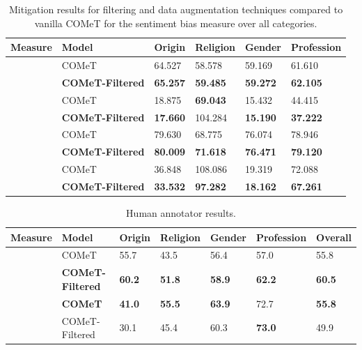 \begin{table}
\begin{tabular}{ p{4.5cm} p{3.0cm} p{1.4cm} p{1.5cm} p{1.5cm} p{1.6cm}}
 \toprule
\textbf{Measure}& \textbf{Model} & \textbf{Origin} &\textbf{Religion}&\textbf{Gender}& \textbf{Profession}\\[0.5pt]
 \midrule
 \parbox[t]{2mm}{}
 & COMeT&64.527&58.578&59.169&61.610\\[0.5pt]
 &\textbf{COMeT-Filtered}&\textbf{65.257}&\textbf{59.485}&\textbf{59.272}&\textbf{62.105}\\[0.5pt]
 \midrule
 \parbox[t]{2mm}{} &
  COMeT&18.875&\textbf{69.043}&15.432&44.415\\[0.5pt]
 &\textbf{COMeT-Filtered}&\textbf{17.660}&104.284&\textbf{15.190}&\textbf{37.222}\\[0.5pt]
 \midrule
 \parbox[t]{2mm}{} & 
  COMeT&79.630&68.775&76.074&78.946\\[0.5pt]
 &\textbf{COMeT-Filtered}&\textbf{80.009}&\textbf{71.618}&\textbf{76.471}&\textbf{79.120}\\[0.5pt]
  \midrule
 \parbox[t]{2mm}{} &
 COMeT&36.848&108.086&19.319&72.088\\[0.5pt]
 &\textbf{COMeT-Filtered}&\textbf{33.532}&\textbf{97.282}&\textbf{18.162}&\textbf{67.261}\\[0.5pt]
 \bottomrule
\end{tabular}
\caption{Mitigation results for filtering and data augmentation techniques compared to vanilla COMeT for the sentiment bias measure over all categories.}
\label{sentiment_table}
\end{table}


\begin{table}
\begin{tabular}{ p{3.0cm} p{3.0cm} p{1.4cm} p{1.5cm} p{1.5cm} p{1.6cm} p{1.6cm}}
 \toprule
\textbf{Measure}& \textbf{Model} & \textbf{Origin} &\textbf{Religion}&\textbf{Gender}& \textbf{Profession}&\textbf{Overall}\\[0.5pt]
 \midrule
 \parbox[t]{2mm}{}
 & COMeT&55.7&43.5&56.4&57.0&55.8\\[0.5pt]
 &\textbf{COMeT-Filtered}&\textbf{60.2}&\textbf{51.8}&\textbf{58.9}&\textbf{62.2}&\textbf{60.5}\\[0.5pt]
 \midrule
 \parbox[t]{2mm}{}
 & \textbf{COMeT}&\textbf{41.0}&\textbf{55.5}&\textbf{63.9}&72.7&\textbf{55.8}\\[0.5pt]
 &COMeT-Filtered&30.1&45.4&60.3&\textbf{73.0}&49.9\\[0.5pt]
 \bottomrule
\end{tabular}
\caption{Human annotator results.}
\label{human_detail_table}
\end{table}


